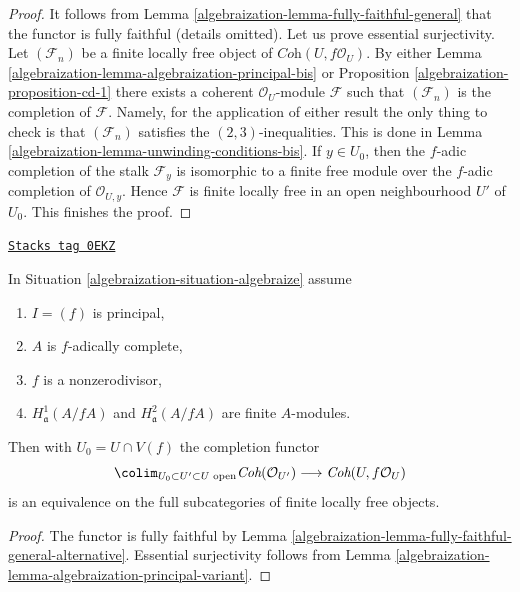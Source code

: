 \begin{proof}

It follows from Lemma \ref{algebraization-lemma-fully-faithful-general}
that the functor is fully faithful (details omitted).
Let us prove essential surjectivity. Let $(\mathcal{F}_n)$ be a finite locally
free object of $\textit{Coh}(U, f\mathcal{O}_U)$. By either
Lemma \ref{algebraization-lemma-algebraization-principal-bis} or
Proposition \ref{algebraization-proposition-cd-1}
there exists a coherent $\mathcal{O}_U$-module $\mathcal{F}$
such that $(\mathcal{F}_n)$ is the completion of $\mathcal{F}$.
Namely, for the application of either result the only thing to
check is that $(\mathcal{F}_n)$ satisfies the $(2, 3)$-inequalities.
This is done in Lemma \ref{algebraization-lemma-unwinding-conditions-bis}. If $y \in U_0$,
then the $f$-adic completion of the stalk $\mathcal{F}_y$ is isomorphic to
a finite free module over the $f$-adic completion of $\mathcal{O}_{U, y}$.
Hence $\mathcal{F}$ is finite locally free in an open neighbourhood
$U'$ of $U_0$. This finishes the proof.
\end{proof}

\begin{lemma}[Equivalence]
\label{algebraization-lemma-equivalence}
\href{https://stacks.math.columbia.edu/tag/0EKZ}{\texttt{Stacks tag 0EKZ}}

In Situation \ref{algebraization-situation-algebraize} assume
\begin{enumerate}
\item $I = (f)$ is principal,
\item $A$ is $f$-adically complete,
\item $f$ is a nonzerodivisor,
\item $H^1_\mathfrak a(A/fA)$ and $H^2_\mathfrak a(A/fA)$
are finite $A$-modules.
\end{enumerate}
Then with $U_0 = U \cap V(f)$ the completion functor
$$
\colim_{U_0 \subset U' \subset U\text{ open}}
\textit{Coh}(\mathcal{O}_{U'})
\longrightarrow
\textit{Coh}(U, f\mathcal{O}_U)
$$
is an equivalence on the full subcategories of finite locally free objects.
\end{lemma}

\begin{proof}

The functor is fully faithful by
Lemma \ref{algebraization-lemma-fully-faithful-general-alternative}.
Essential surjectivity follows from
Lemma \ref{algebraization-lemma-algebraization-principal-variant}.
\end{proof}

